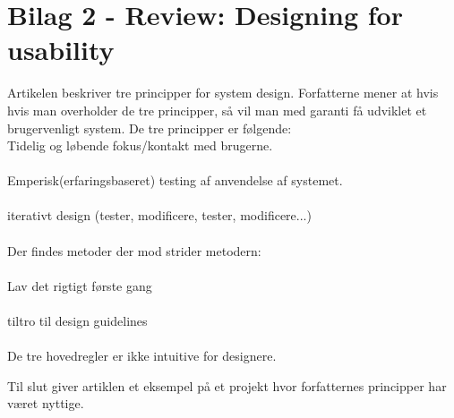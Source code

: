 \documentclass[a4paper,12pt]{article}
\begin{document}
\section{Bilag 2 - Review: Designing for usability}
Artikelen beskriver tre principper for system design. Forfatterne mener at hvis
hvis man overholder de tre principper, så vil man med garanti få udviklet et brugervenligt system.  
De tre principper er følgende:
\newline
\\
Tidelig og løbende fokus/kontakt med brugerne.
\\
\\
Emperisk(erfaringsbaseret) testing af anvendelse af systemet.
\\
\\
iterativt design (tester, modificere, tester, modificere...) 
\\
\\
Der findes metoder der mod strider metodern:
\\
\\
Lav det rigtigt første gang 
\\
\\
tiltro til design guidelines
\\
\\
De tre hovedregler er ikke intuitive for designere. 

Til slut giver artiklen et eksempel på et projekt hvor forfatternes principper har været nyttige.
\end{document}

